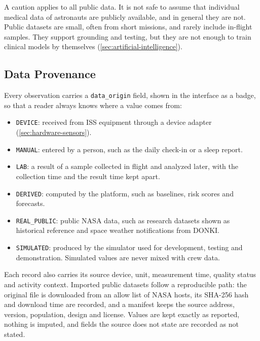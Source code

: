 A caution applies to all public data. It is not safe to assume that individual medical data of astronauts are publicly available, and in general they are not. Public datasets are small, often from short missions, and rarely include in-flight samples. They support grounding and testing, but they are not enough to train clinical models by themselves (\ref{sec:artificial-intelligence}).

\subsection{Data Provenance}
\label{subsec:data-provenance}

Every observation carries a \texttt{data\_origin} field, shown in the interface as a badge, so that a reader always knows where a value comes from:

\begin{itemize}
\item \texttt{DEVICE}: received from ISS equipment through a device adapter (\ref{sec:hardware-sensors}).
\item \texttt{MANUAL}: entered by a person, such as the daily check-in or a sleep report.
\item \texttt{LAB}: a result of a sample collected in flight and analyzed later, with the collection time and the result time kept apart.
\item \texttt{DERIVED}: computed by the platform, such as baselines, risk scores and forecasts.
\item \texttt{REAL\_PUBLIC}: public NASA data, such as research datasets shown as historical reference and space weather notifications from DONKI.
\item \texttt{SIMULATED}: produced by the simulator used for development, testing and demonstration. Simulated values are never mixed with crew data.
\end{itemize}

Each record also carries its source device, unit, measurement time, quality status and activity context. Imported public datasets follow a reproducible path: the original file is downloaded from an allow list of NASA hosts, its SHA-256 hash and download time are recorded, and a manifest keeps the source address, version, population, design and license. Values are kept exactly as reported, nothing is imputed, and fields the source does not state are recorded as not stated.
